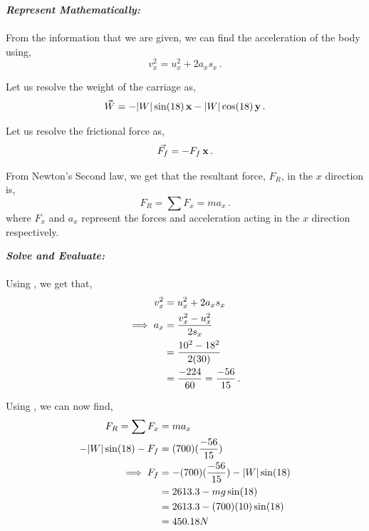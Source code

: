 \begin{subquestions}
\textbf{\textit{Represent Mathematically:}} \\ \\
From the information that we are given, we can find the acceleration of the body using,
\begin{equation}
	v_x^2 = u_x^2 + 2a_xs_x \,. \label{2013:q5:AEqn1} 
\end{equation}

Let us resolve the weight of the carriage as,
\begin{equation}
	\vec{W} = -|W|\sin(18)\,\mathbf{x}-|W|\cos(18)\,\mathbf{y} \,.
\end{equation}

Let us resolve the frictional force as,
\begin{equation}
	\vec{F_f} = -F_f \,\mathbf{x} \,.
\end{equation}

From Newton's Second law, we get that the resultant force, $F_R$, in the $x$ direction is,
\begin{equation}
	F_R = \sum F_x  = ma_x \,.	\label{2013:q5:Newton1}
\end{equation}
where $F_x$ and $a_x$ represent the forces and acceleration acting in the $x$ direction respectively.




\textbf{\textit{Solve and Evaluate:}} \\ \\
Using , we get that,
\begin{align}
	v_x^2 & = u_x^2 + 2a_xs_x \nonumber \\
	\implies a_x & = \frac{v_x^2-u_x^2}{2s_x} \nonumber \\
	  & = \frac{10^2-18^2}{2(30)} \nonumber \\
	  & = \frac{-224}{60} = \frac{-56}{15} \,. 
\end{align}

Using , we can now find,
\begin{align}
	F_R = \sum F_x & = ma_x \nonumber \\
	      -|W|\sin(18) - F_f & = (700)(\frac{-56}{15}) \nonumber \\
	      \implies F_f & = -(700)(\frac{-56}{15})-|W|\sin(18) \nonumber \\
	                   & = 2613.3-mg\sin(18) \nonumber \\
	                   & = 2613.3-(700)(10)\sin(18) \nonumber \\
	                   & = 450.18N
\end{align}


\end{subquestions}
